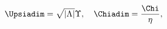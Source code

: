 \begin{equation}
\Upsiadim = \sqrt{|\Lambda|} \Upsilon,\quad \Chiadim = \frac{\Chi}{\eta},
\end{equation}

